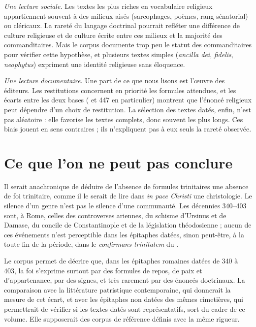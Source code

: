 \emph{Une lecture sociale.} Les textes les plus riches en vocabulaire religieux appartiennent souvent à des milieux aisés (sarcophages, poèmes, rang sénatorial) ou cléricaux. La rareté du langage doctrinal pourrait refléter une différence de culture religieuse et de culture écrite entre ces milieux et la majorité des commanditaires. Mais le corpus documente trop peu le statut des commanditaires pour vérifier cette hypothèse, et plusieurs textes simples (\emph{ancilla dei}, \emph{fidelis}, \emph{neophytus}) expriment une identité religieuse sans éloquence.

\emph{Une lecture documentaire.} Une part de ce que nous lisons est l’œuvre des éditeurs. Les restitutions concernent en priorité les formules attendues, et les écarts entre les deux bases ( et 447 en particulier) montrent que l’énoncé religieux peut dépendre d’un choix de restitution. La sélection des textes datés, enfin, n’est pas aléatoire : elle favorise les textes complets, donc souvent les plus longs. Ces biais jouent en sens contraires ; ils n’expliquent pas à eux seuls la rareté observée.

\section{Ce que l’on ne peut pas conclure}

Il serait anachronique de déduire de l’absence de formules trinitaires une absence de foi trinitaire, comme il le serait de lire dans \emph{in pace Christi} une christologie. Le silence d’un genre n’est pas le silence d’une communauté. Les décennies 340–403 sont, à Rome, celles des controverses ariennes, du schisme d’Ursinus et de Damase, du concile de Constantinople et de la législation théodosienne ; aucun de ces événements n’est perceptible dans les épitaphes datées, sinon peut-être, à la toute fin de la période, dans le \emph{confirmans trinitatem} du .

Le corpus permet de décrire que, dans les épitaphes romaines datées de 340 à 403, la foi s’exprime surtout par des formules de repos, de paix et d’appartenance, par des signes, et très rarement par des énoncés doctrinaux. La comparaison avec la littérature patristique contemporaine, qui donnerait la mesure de cet écart, et avec les épitaphes non datées des mêmes cimetières, qui permettrait de vérifier si les textes datés sont représentatifs, sort du cadre de ce volume. Elle supposerait des corpus de référence définis avec la même rigueur.
